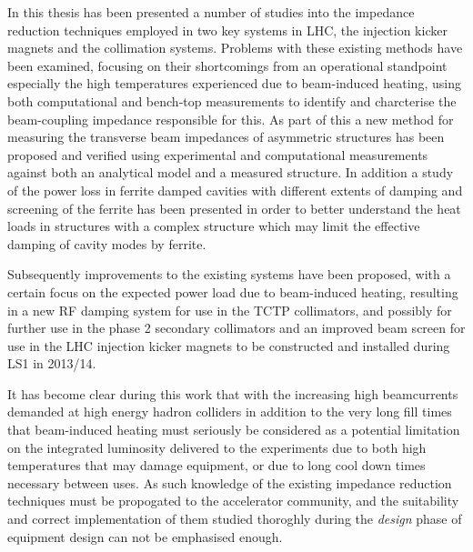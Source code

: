 In this thesis has been presented a number of studies into the impedance reduction techniques employed in two key systems in LHC, the injection kicker magnets and the collimation systems. Problems with these existing methods have been examined, focusing on their shortcomings from an operational standpoint especially the high temperatures experienced due to beam-induced heating, using both computational and bench-top measurements to identify and charcterise the beam-coupling impedance responsible for this. As part of this a new method for measuring the transverse beam impedances of asymmetric structures has been proposed and verified using experimental and computational measurements against both an analytical model and a measured structure. In addition a study of the power loss in ferrite damped cavities with different extents of damping and screening of the ferrite has been presented in order to better understand the heat loads in structures with a complex structure which may limit the effective damping of cavity modes by ferrite.

Subsequently improvements to the existing systems have been proposed, with a certain focus on the expected power load due to beam-induced heating, resulting in a new RF damping system for use in the TCTP collimators, and possibly for further use in the phase 2 secondary collimators and an improved beam screen for use in the LHC injection kicker magnets to be constructed and installed during LS1 in 2013/14.

It has become clear during this work that with the increasing high beamcurrents demanded at high energy hadron colliders in addition to the very long fill times that beam-induced heating must seriously be considered as a potential limitation on the integrated luminosity delivered to the experiments due to both high temperatures that may damage equipment, or due to long cool down times necessary between uses. As such knowledge of the existing impedance reduction techniques must be propogated to the accelerator community, and the suitability and correct implementation of them studied thoroghly during the \emph{design} phase of equipment design can not be emphasised enough.